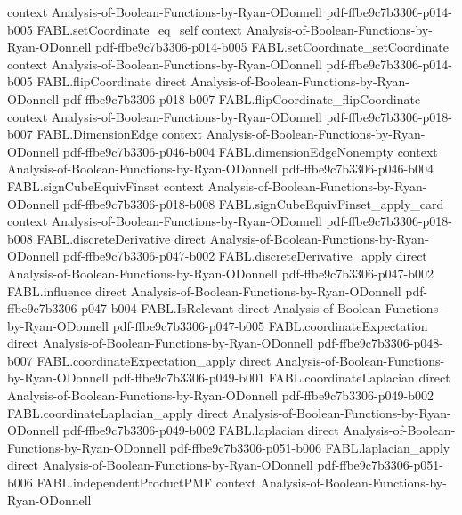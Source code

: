 \begin{theorem}
  {context}
  {Analysis-of-Boolean-Functions-by-Ryan-ODonnell}
  {pdf-ffbe9c7b3306-p014-b005}
\proofstep
  {FABL.setCoordinate_eq_self}
  {context}
  {Analysis-of-Boolean-Functions-by-Ryan-ODonnell}
  {pdf-ffbe9c7b3306-p014-b005}
\proofstep
  {FABL.setCoordinate_setCoordinate}
  {context}
  {Analysis-of-Boolean-Functions-by-Ryan-ODonnell}
  {pdf-ffbe9c7b3306-p014-b005}
\proofstep
  {FABL.flipCoordinate}
  {direct}
  {Analysis-of-Boolean-Functions-by-Ryan-ODonnell}
  {pdf-ffbe9c7b3306-p018-b007}
\proofstep
  {FABL.flipCoordinate_flipCoordinate}
  {context}
  {Analysis-of-Boolean-Functions-by-Ryan-ODonnell}
  {pdf-ffbe9c7b3306-p018-b007}
\proofstep
  {FABL.DimensionEdge}
  {context}
  {Analysis-of-Boolean-Functions-by-Ryan-ODonnell}
  {pdf-ffbe9c7b3306-p046-b004}
\proofstep
  {FABL.dimensionEdgeNonempty}
  {context}
  {Analysis-of-Boolean-Functions-by-Ryan-ODonnell}
  {pdf-ffbe9c7b3306-p046-b004}
\proofstep
  {FABL.signCubeEquivFinset}
  {context}
  {Analysis-of-Boolean-Functions-by-Ryan-ODonnell}
  {pdf-ffbe9c7b3306-p018-b008}
\proofstep
  {FABL.signCubeEquivFinset_apply_card}
  {context}
  {Analysis-of-Boolean-Functions-by-Ryan-ODonnell}
  {pdf-ffbe9c7b3306-p018-b008}
\proofstep
  {FABL.discreteDerivative}
  {direct}
  {Analysis-of-Boolean-Functions-by-Ryan-ODonnell}
  {pdf-ffbe9c7b3306-p047-b002}
\proofstep
  {FABL.discreteDerivative_apply}
  {direct}
  {Analysis-of-Boolean-Functions-by-Ryan-ODonnell}
  {pdf-ffbe9c7b3306-p047-b002}
\proofstep
  {FABL.influence}
  {direct}
  {Analysis-of-Boolean-Functions-by-Ryan-ODonnell}
  {pdf-ffbe9c7b3306-p047-b004}
\proofstep
  {FABL.IsRelevant}
  {direct}
  {Analysis-of-Boolean-Functions-by-Ryan-ODonnell}
  {pdf-ffbe9c7b3306-p047-b005}
\proofstep
  {FABL.coordinateExpectation}
  {direct}
  {Analysis-of-Boolean-Functions-by-Ryan-ODonnell}
  {pdf-ffbe9c7b3306-p048-b007}
\proofstep
  {FABL.coordinateExpectation_apply}
  {direct}
  {Analysis-of-Boolean-Functions-by-Ryan-ODonnell}
  {pdf-ffbe9c7b3306-p049-b001}
\proofstep
  {FABL.coordinateLaplacian}
  {direct}
  {Analysis-of-Boolean-Functions-by-Ryan-ODonnell}
  {pdf-ffbe9c7b3306-p049-b002}
\proofstep
  {FABL.coordinateLaplacian_apply}
  {direct}
  {Analysis-of-Boolean-Functions-by-Ryan-ODonnell}
  {pdf-ffbe9c7b3306-p049-b002}
\proofstep
  {FABL.laplacian}
  {direct}
  {Analysis-of-Boolean-Functions-by-Ryan-ODonnell}
  {pdf-ffbe9c7b3306-p051-b006}
\proofstep
  {FABL.laplacian_apply}
  {direct}
  {Analysis-of-Boolean-Functions-by-Ryan-ODonnell}
  {pdf-ffbe9c7b3306-p051-b006}
\proofstep
  {FABL.independentProductPMF}
  {context}
  {Analysis-of-Boolean-Functions-by-Ryan-ODonnell}

\end{theorem}

